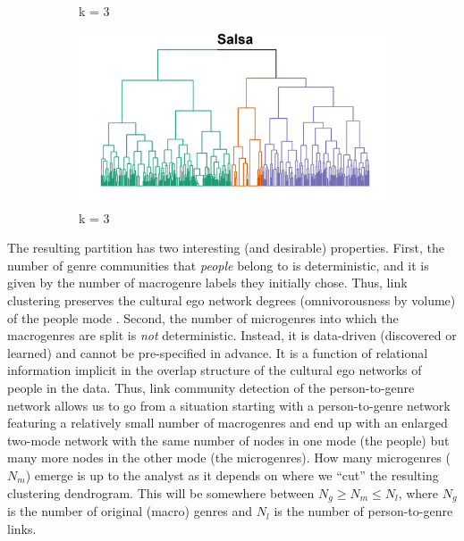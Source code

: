 \documentclass[a4paper,12pt]{extarticle}
\begin{document}
\begin{figure}[t!]
\begin{subfigure}[b]{0.5\textwidth}
        \caption{k = 3}
        \label{fig:dend-micro-metal}
    \end{subfigure}
     \begin{subfigure}[b]{0.5\textwidth}
        \centering
        \includegraphics[width=1.0\textwidth]{Plots/Dend/salsa-branches.png}
        \caption{k = 3}
        \label{fig:dend-micro-salsa}
    \end{subfigure}
    \caption{}
    \label{fig:dend}
 \end{figure}
 
The resulting partition has two interesting (and desirable) properties. First, the number of genre communities that \textit{people} belong to is deterministic, and it is given by the number of macrogenre labels they initially chose. Thus, link clustering preserves the cultural ego network degrees (omnivorousness by volume) of the people mode \citep{lizardo14}. Second, the number of microgenres into which the macrogenres are split is {\em not} deterministic. Instead, it is data-driven (discovered or learned) and cannot be pre-specified in advance. It is a function of relational information implicit in the overlap structure of the cultural ego networks of people in the data. Thus, link community detection of the person-to-genre network allows us to go from a situation starting with a person-to-genre network featuring a relatively small number of macrogenres and end up with an enlarged two-mode network with the same number of nodes in one mode (the people) but many more nodes in the other mode (the microgenres). How many microgenres ($N_m$) emerge is up to the analyst as it depends on where we ``cut'' the resulting clustering dendrogram. This will be somewhere between $N_g \geq N_m \leq N_l$, where $N_g$ is the number of original (macro) genres and $N_l$ is the number of person-to-genre links.
\end{document}

